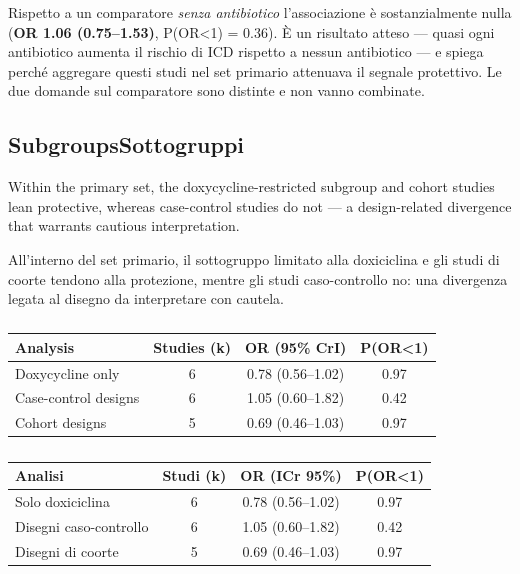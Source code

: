 \documentclass[
  letterpaper,
  DIV=11,
  numbers=noendperiod]{scrartcl}
\begin{document}
Rispetto a un comparatore \emph{senza antibiotico} l'associazione è
sostanzialmente nulla (\textbf{OR 1.06 (0.75--1.53)}, P(OR\textless1) =
0.36). È un risultato atteso --- quasi ogni antibiotico aumenta il
rischio di ICD rispetto a nessun antibiotico --- e spiega perché
aggregare questi studi nel set primario attenuava il segnale protettivo.
Le due domande sul comparatore sono distinte e non vanno combinate.

\subsection{\texorpdfstring{{Subgroups}{Sottogruppi}}{SubgroupsSottogruppi}}\label{subgroupssottogruppi}

Within the primary set, the doxycycline-restricted subgroup and cohort
studies lean protective, whereas case-control studies do not --- a
design-related divergence that warrants cautious interpretation.

All'interno del set primario, il sottogruppo limitato alla doxiciclina e
gli studi di coorte tendono alla protezione, mentre gli studi
caso-controllo no: una divergenza legata al disegno da interpretare con
cautela.

{

\begin{longtable}[]{@{}lccc@{}}

\caption{\label{tbl-sub-en}}

\tabularnewline

\toprule\noalign{}
Analysis & Studies (k) & OR (95\% CrI) & P(OR\textless1) \\
\midrule\noalign{}
\endhead
\bottomrule\noalign{}
\endlastfoot
Doxycycline only & 6 & 0.78 (0.56--1.02) & 0.97 \\
Case-control designs & 6 & 1.05 (0.60--1.82) & 0.42 \\
Cohort designs & 5 & 0.69 (0.46--1.03) & 0.97 \\

\end{longtable}

}

{

\begin{longtable}[]{@{}lccc@{}}

\caption{\label{tbl-sub-it}}

\tabularnewline

\toprule\noalign{}
Analisi & Studi (k) & OR (ICr 95\%) & P(OR\textless1) \\
\midrule\noalign{}
\endhead
\bottomrule\noalign{}
\endlastfoot
Solo doxiciclina & 6 & 0.78 (0.56--1.02) & 0.97 \\
Disegni caso-controllo & 6 & 1.05 (0.60--1.82) & 0.42 \\
Disegni di coorte & 5 & 0.69 (0.46--1.03) & 0.97 \\

\end{longtable}

}
\end{document}
